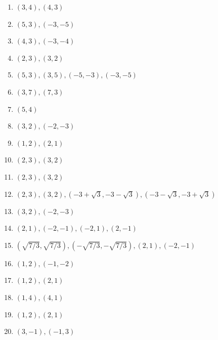 \documentclass[11pt,a4paper]{scrartcl}
\begin{document}
\begin{enumerate}
    \item $(3,4), (4,3)$
    \item $(5,3), (-3,-5)$
    \item $(4,3), (-3,-4)$
    \item $(2,3), (3,2)$
    \item $(5,3), (3,5), (-5,-3), (-3,-5)$
    \item $(3,7), (7,3)$
    \item $(5,4)$
    \item $(3,2), (-2,-3)$
    \item $(1,2), (2,1)$
    \item $(2,3), (3,2)$
    \item $(2,3), (3,2)$
    \item $(2,3), (3,2), (-3+\sqrt{3}, -3-\sqrt{3}), (-3-\sqrt{3}, -3+\sqrt{3})$
    \item $(3,2), (-2,-3)$
    \item $(2,1), (-2,-1), (-2,1), (2,-1)$
    \item $(\sqrt{7/3},\sqrt{7/3}), (-\sqrt{7/3},-\sqrt{7/3}), (2,1), (-2,-1)$
    \item $(1,2), (-1,-2)$
    \item $(1,2), (2,1)$
    \item $(1,4), (4,1)$
    \item $(1,2), (2,1)$
    \item $(3,-1), (-1,3)$
\end{enumerate}
\end{document}
